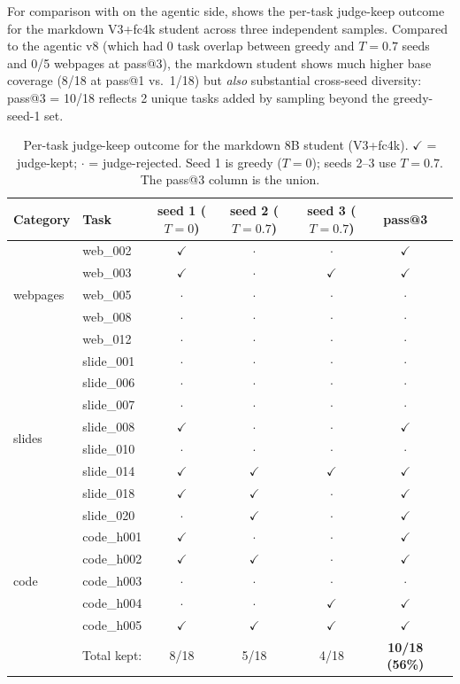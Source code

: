 \documentclass[11pt]{article}
\begin{document}
For comparison with  on the agentic side,  shows the per-task judge-keep outcome for the markdown V3+fc4k student across three independent samples.  Compared to the agentic v8 (which had 0 task overlap between greedy and $T{=}0.7$ seeds and 0/5 webpages at pass@3), the markdown student shows much higher base coverage (8/18 at pass@1 vs.\ 1/18) but \emph{also} substantial cross-seed diversity: pass@3 = 10/18 reflects 2 unique tasks added by sampling beyond the greedy-seed-1 set.

\begin{table}[ht]
\centering
\caption{Per-task judge-keep outcome for the markdown 8B student (V3+fc4k). $\checkmark$ = judge-kept; $\cdot$ = judge-rejected. Seed 1 is greedy ($T{=}0$); seeds 2--3 use $T{=}0.7$. The pass@3 column is the union.}
\label{tab:per-task-md}
\small
\begin{tabular}{llccccc}
\toprule
Category & Task & seed 1 ($T{=}0$) & seed 2 ($T{=}0.7$) & seed 3 ($T{=}0.7$) & pass@3 \\
\midrule
\multirow{5}{*}{webpages} & web\_002 & $\checkmark$ & $\cdot$ & $\cdot$ & $\checkmark$ \\
& web\_003 & $\checkmark$ & $\cdot$ & $\checkmark$ & $\checkmark$ \\
& web\_005 & $\cdot$ & $\cdot$ & $\cdot$ & $\cdot$ \\
& web\_008 & $\cdot$ & $\cdot$ & $\cdot$ & $\cdot$ \\
& web\_012 & $\cdot$ & $\cdot$ & $\cdot$ & $\cdot$ \\
\midrule
\multirow{8}{*}{slides} & slide\_001 & $\cdot$ & $\cdot$ & $\cdot$ & $\cdot$ \\
& slide\_006 & $\cdot$ & $\cdot$ & $\cdot$ & $\cdot$ \\
& slide\_007 & $\cdot$ & $\cdot$ & $\cdot$ & $\cdot$ \\
& slide\_008 & $\checkmark$ & $\cdot$ & $\cdot$ & $\checkmark$ \\
& slide\_010 & $\cdot$ & $\cdot$ & $\cdot$ & $\cdot$ \\
& slide\_014 & $\checkmark$ & $\checkmark$ & $\checkmark$ & $\checkmark$ \\
& slide\_018 & $\checkmark$ & $\checkmark$ & $\cdot$ & $\checkmark$ \\
& slide\_020 & $\cdot$ & $\checkmark$ & $\cdot$ & $\checkmark$ \\
\midrule
\multirow{5}{*}{code} & code\_h001 & $\checkmark$ & $\cdot$ & $\cdot$ & $\checkmark$ \\
& code\_h002 & $\checkmark$ & $\checkmark$ & $\cdot$ & $\checkmark$ \\
& code\_h003 & $\cdot$ & $\cdot$ & $\cdot$ & $\cdot$ \\
& code\_h004 & $\cdot$ & $\cdot$ & $\checkmark$ & $\checkmark$ \\
& code\_h005 & $\checkmark$ & $\checkmark$ & $\checkmark$ & $\checkmark$ \\
\midrule
\multicolumn{2}{r}{Total kept:} & 8/18 & 5/18 & 4/18 & \textbf{10/18 (56\%)} \\
\bottomrule
\end{tabular}
\end{table}
\end{document}
